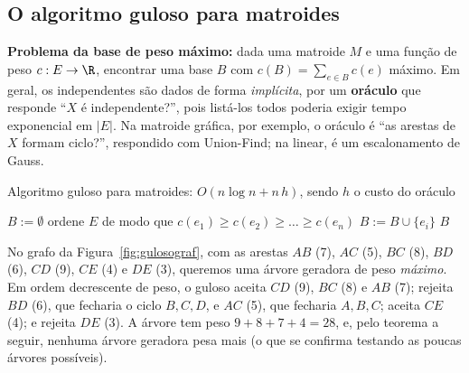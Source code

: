 \subsection{O algoritmo guloso para matroides}
\textbf{Problema da base de peso máximo:} dada uma matroide $M$ e uma função de peso $c:E\to\R$, encontrar uma base $B$ com $c(B)=\sum_{e\in B}c(e)$ máximo. Em geral, os independentes são dados de forma \emph{implícita}, por um \textbf{oráculo} que responde ``$X$ é independente?'', pois listá-los todos poderia exigir tempo exponencial em $|E|$. Na matroide gráfica, por exemplo, o oráculo é ``as arestas de $X$ formam ciclo?'', respondido com Union-Find; na linear, é um escalonamento de Gauss.
\begin{pseudo}{Algoritmo guloso para matroides: $O(n\log n+n\,h)$, sendo $h$ o custo do oráculo}
\begin{algorithmic}
  \State $B:=\emptyset$
  \State ordene $E$ de modo que $c(e_1)\ge c(e_2)\ge\dots\ge c(e_n)$ 
     \State $B:=B\cup\{e_i\}$ \EndIf
  \EndFor
  \State \Return $B$
\EndFunction
\end{algorithmic}
\end{pseudo}

\begin{exemplo}\label{ex:gulosograf}
No grafo da Figura~\ref{fig:gulosograf}, com as arestas $AB$ (7), $AC$ (5), $BC$ (8), $BD$ (6), $CD$ (9), $CE$ (4) e $DE$ (3), queremos uma árvore geradora de peso \emph{máximo}. Em ordem decrescente de peso, o guloso aceita $CD$ (9), $BC$ (8) e $AB$ (7); rejeita $BD$ (6), que fecharia o ciclo $B,C,D$, e $AC$ (5), que fecharia $A,B,C$; aceita $CE$ (4); e rejeita $DE$ (3). A árvore tem peso $9+8+7+4=28$, e, pelo teorema a seguir, nenhuma árvore geradora pesa mais (o que se confirma testando as poucas árvores possíveis).
\begin{figura}
\end{figura}
\end{exemplo}

